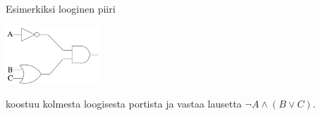 \begin{tehtavasivu}
\begin{tehtava}
\begin{center}
\begin{tabular}{|>{\centering}m{1.5cm}|>{\raggedright}m{3.8cm}|c|>{\centering\arraybackslash}m{2cm}|}
        \end{tabular}

        \end{center}

        \normalsize


        \bigskip

        Esimerkiksi looginen piiri

        \medskip

        \begin{center}
        \includegraphics[width=3.5cm]{pictures/boole/boolesim-ABC}
        \end{center}

        \medskip
        \noindent
        koostuu kolmesta loogisesta portista ja vastaa
        lausetta \mbox{$\lnot A\land (B \lor C)$}. %



\end{tehtava}
\end{tehtavasivu}
